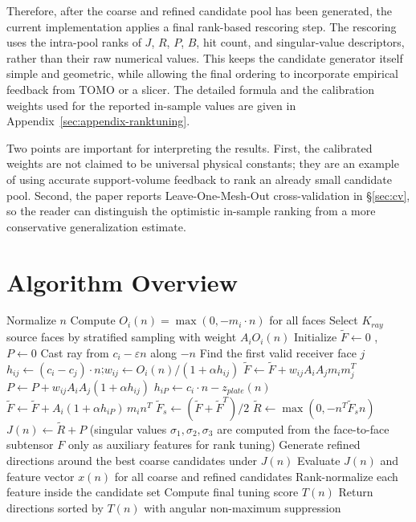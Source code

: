\documentclass[11pt,a4paper]{article}
\begin{document}
Therefore, after the coarse and refined candidate pool has been generated, the current implementation applies a final rank-based rescoring step.
The rescoring uses the intra-pool ranks of $J$, $R$, $P$, $B$, hit count, and singular-value descriptors, rather than their raw numerical values.
This keeps the candidate generator itself simple and geometric, while allowing the final ordering to incorporate empirical feedback from TOMO or a slicer.
The detailed formula and the calibration weights used for the reported in-sample values are given in Appendix~\ref{sec:appendix-ranktuning}.

Two points are important for interpreting the results.
First, the calibrated weights are not claimed to be universal physical constants; they are an example of using accurate support-volume feedback to rank an already small candidate pool.
Second, the paper reports Leave-One-Mesh-Out cross-validation in \S\ref{sec:cv}, so the reader can distinguish the optimistic in-sample ranking from a more conservative generalization estimate.

\section{Algorithm Overview}

\begin{algorithm}[H]
\caption{Augmented (ground-node) Support Flow Tensor Evaluation with Final Rank Tuning}
\begin{algorithmic}[1]
    \State Normalize $n$
    \State Compute $O_i(n)=\max(0,-m_i\cdot n)$ for all faces
    \State Select $K_{ray}$ source faces by stratified sampling with weight $A_iO_i(n)$
    \State Initialize $\tilde F\gets 0$ , $P\gets 0$
        \State Cast ray from $c_i-\varepsilon n$ along $-n$
        \State Find the first valid receiver face $j$
            \State $h_{ij}\gets(c_i-c_j)\cdot n$;\quad $w_{ij}\gets O_i(n)/(1+\alpha h_{ij})$
            \State $\tilde F\gets \tilde F+w_{ij}A_iA_jm_im_j^T$ 
            \State $P\gets P+w_{ij}A_iA_j(1+\alpha h_{ij})$
        \Else
            \State $h_{iP}\gets c_i\cdot n-z_{plate}(n)$
            \State $\tilde F\gets \tilde F+A_i(1+\alpha h_{iP})\,m_in^T$ 
        \EndIf
    \EndFor
    \State $\tilde F_s\gets(\tilde F+\tilde F^T)/2$
    \State $\tilde R\gets\max(0,-n^T\tilde F_sn)$ 
    \State $J(n)\gets \tilde R+P$
    \State (singular values $\sigma_1,\sigma_2,\sigma_3$ are computed from the face-to-face subtensor $F$ only as auxiliary features for rank tuning)
\EndFor
\State Generate refined directions around the best coarse candidates under $J(n)$
\State Evaluate $J(n)$ and feature vector $x(n)$ for all coarse and refined candidates
\State Rank-normalize each feature inside the candidate set
\State Compute final tuning score $T(n)$
\State Return directions sorted by $T(n)$ with angular non-maximum suppression
\end{algorithmic}
\end{algorithm}
\end{document}
